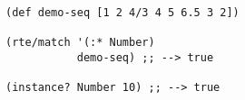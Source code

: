 \begin{lstlisting}[style=reclojureClojure,frame=single]
(def demo-seq [1 2 4/3 4 5 6.5 3 2])

(rte/match '(:* Number)
           demo-seq) ;; --> true

(instance? Number 10) ;; --> true
\end{lstlisting}
